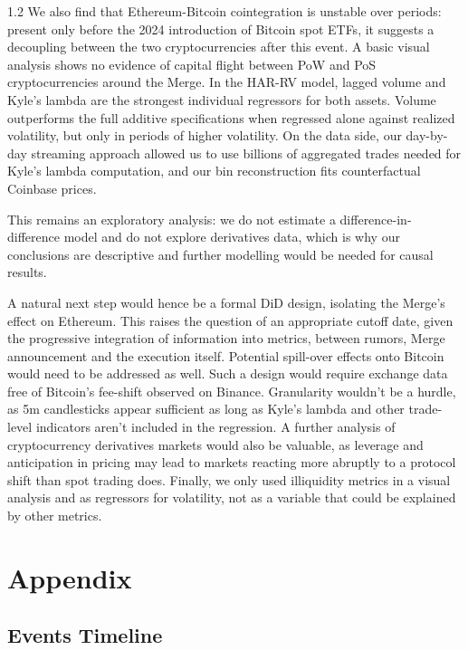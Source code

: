 \documentclass[10pt]{article}
\begin{document}
\begin{setstretch}{1.2}
We also find that Ethereum-Bitcoin cointegration is unstable over periods: present only before the 2024 introduction of Bitcoin spot ETFs, it suggests a decoupling between the two cryptocurrencies after this event. A basic visual analysis shows no evidence of capital flight between PoW and PoS cryptocurrencies around the Merge. In the HAR-RV model, lagged volume and Kyle's lambda are the strongest individual regressors for both assets. Volume outperforms the full additive specifications when regressed alone against realized volatility, but only in periods of higher volatility. On the data side, our day-by-day streaming approach allowed us to use billions of aggregated trades needed for Kyle's lambda computation, and our bin reconstruction fits counterfactual Coinbase prices. 

This remains an exploratory analysis: we do not estimate a difference-in-difference model and do not explore derivatives data, which is why our conclusions are descriptive and further modelling would be needed for causal results.

A natural next step would hence be a formal DiD design, isolating the Merge's effect on Ethereum. This raises the question of an appropriate cutoff date, given the progressive integration of information into metrics, between rumors, Merge announcement and the execution itself. Potential spill-over effects onto Bitcoin would need to be addressed as well. Such a design would require exchange data free of Bitcoin's fee-shift observed on Binance. Granularity wouldn't be a hurdle, as 5m candlesticks appear sufficient as long as Kyle's lambda and other trade-level indicators aren't included in the regression. A further analysis of cryptocurrency derivatives markets would also be valuable, as leverage and anticipation in pricing may lead to markets reacting more abruptly to a protocol shift than spot trading does. Finally, we only used illiquidity metrics in a visual analysis and as regressors for volatility, not as a variable that could be explained by other metrics.

\setlength{\bibitemsep}{1em}
\printbibliography

\clearpage %
\appendix
\section{Appendix}
    \subsection{Events Timeline}
    \label{sec:appendixEvents}


\end{setstretch}
\end{document}

